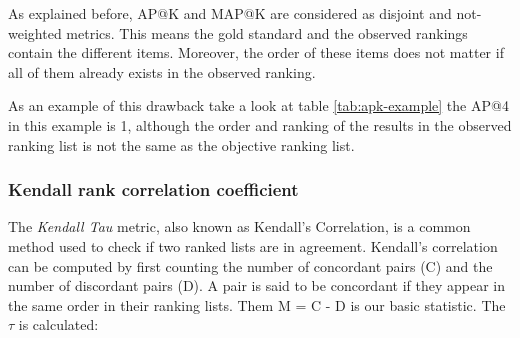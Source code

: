 As explained before, AP@K and MAP@K are considered as disjoint and not-weighted metrics. This means the gold standard and the observed rankings contain the different items. Moreover, the order of these items does not matter if all of them already exists in the observed ranking.

As an example of this drawback take a look at table \ref{tab:apk-example} the AP@4 in this example is 1, although the order and ranking of the results in the observed ranking list is not the same as the objective ranking list.






\subsubsection{Kendall rank correlation coefficient}
The \emph{Kendall Tau} \cite{kendall1938new} metric, also known as Kendall's Correlation, is a common method used to check if two ranked lists are in agreement. Kendall's correlation can be computed by first counting the number of concordant pairs (C) and the number of discordant pairs (D). A pair is said to be concordant if they appear in the same order in their ranking lists. Them M = C - D is our basic statistic. The $\tau$ is calculated: 

